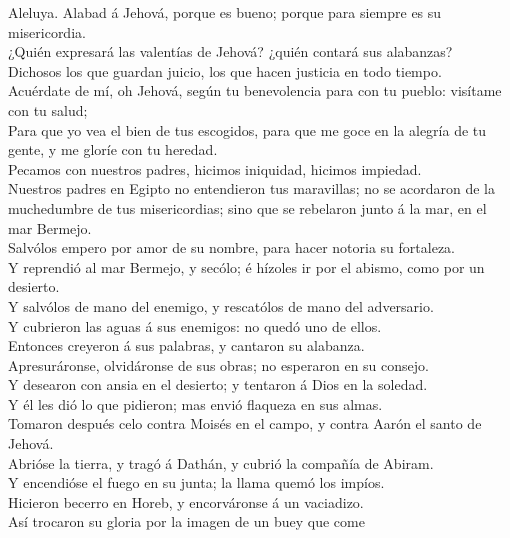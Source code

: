  Aleluya. Alabad á Jehová, porque es bueno; porque para
siempre es su misericordia.\\
 ¿Quién expresará las valentías de Jehová? ¿quién contará
sus alabanzas?\\
 Dichosos los que guardan juicio, los que hacen justicia
en todo tiempo.\\
 Acuérdate de mí, oh Jehová, según tu benevolencia para
con tu pueblo: visítame con tu salud;\\
 Para que yo vea el bien de tus escogidos, para que me
goce en la alegría de tu gente, y me gloríe con tu heredad.\\
 Pecamos con nuestros padres, hicimos iniquidad, hicimos
impiedad.\\
 Nuestros padres en Egipto no entendieron tus maravillas;
no se acordaron de la muchedumbre de tus misericordias; sino que se
rebelaron junto á la mar, en el mar Bermejo.\\
 Salvólos empero por amor de su nombre, para hacer notoria
su fortaleza.\\
 Y reprendió al mar Bermejo, y secólo; é hízoles ir por el
abismo, como por un desierto.\\
 Y salvólos de mano del enemigo, y rescatólos de mano del
adversario.\\
 Y cubrieron las aguas á sus enemigos: no quedó uno de
ellos.\\
 Entonces creyeron á sus palabras, y cantaron su
alabanza.\\
 Apresuráronse, olvidáronse de sus obras; no esperaron en
su consejo.\\
 Y desearon con ansia en el desierto; y tentaron á Dios
en la soledad.\\
 Y él les dió lo que pidieron; mas envió flaqueza en sus
almas.\\
 Tomaron después celo contra Moisés en el campo, y contra
Aarón el santo de Jehová.\\
 Abrióse la tierra, y tragó á Dathán, y cubrió la
compañía de Abiram.\\
 Y encendióse el fuego en su junta; la llama quemó los
impíos.\\
 Hicieron becerro en Horeb, y encorváronse á un
vaciadizo.\\
 Así trocaron su gloria por la imagen de un buey que come
